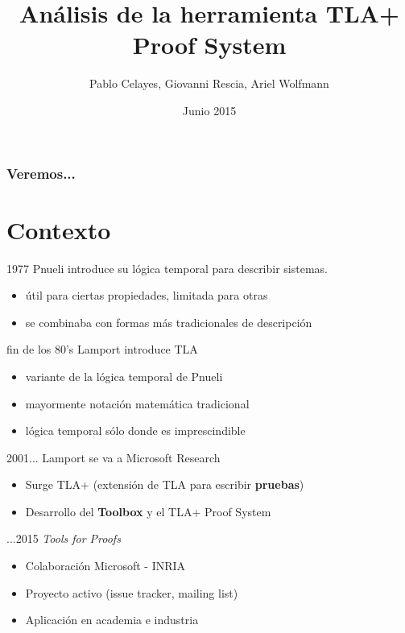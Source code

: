 \documentclass[12pt,center]{beamer}
\title{Análisis de la herramienta TLA+ Proof System}
\author{Pablo Celayes, Giovanni Rescia, Ariel Wolfmann}
\institute{Facultad de Matemática, Astronomía y Física\\
Universidad Nacional de Córdoba}
\date{Junio 2015}
\newenvironment{stepitemize}{\begin{itemize}[<+->]}{\end{itemize} }
\begin{document}
\begin{frame}
  \titlepage
\end{frame}

\begin{frame}
  \frametitle{Veremos...}
  \tableofcontents[pausesections]
\end{frame}


\section{Contexto}
\begin{frame}{1977}
  Pnueli introduce su lógica temporal para describir sistemas.
  \pause
  \begin{stepitemize}
    \item útil para ciertas propiedades, limitada para otras
    \item se combinaba con formas más tradicionales de descripción
  \end{stepitemize}
\end{frame}	
	
\begin{frame}{fin de los 80's}
  Lamport introduce TLA
  \pause
  \begin{stepitemize}
    \item variante de la lógica temporal de Pnueli
    \item mayormente notación matemática tradicional
    \item lógica temporal sólo donde es imprescindible  
  \end{stepitemize}
\end{frame}	

\begin{frame}{2001...}
  Lamport se va a Microsoft Research
  \pause
  \begin{stepitemize}
    \item Surge TLA+ (extensión de TLA para escribir \textbf{pruebas})
    \item Desarrollo del \textbf{Toolbox} y el {TLA+ Proof System}
  \end{stepitemize}
\end{frame}
	
\begin{frame}{...2015}
  \textit{Tools for Proofs}
  \pause
  \begin{stepitemize}
    \item Colaboración Microsoft - INRIA
    \item Proyecto activo (issue tracker, mailing list)
    \item Aplicación en academia e industria
  \end{stepitemize}
\end{frame}
\end{document}
